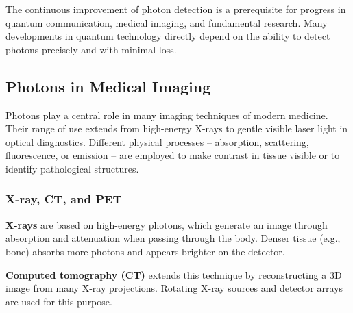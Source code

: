 \begin{tcolorbox}[hinweisbox, title=Note on the Importance of Detection Technology]
	\label{box:detektionstechnologie}
	The continuous improvement of photon detection is a prerequisite for progress in quantum communication, medical imaging, and fundamental research. Many developments in quantum technology directly depend on the ability to detect photons precisely and with minimal loss.
\end{tcolorbox}
\subsection{Photons in Medical Imaging}

Photons play a central role in many imaging techniques of modern medicine. Their range of use extends from high-energy X-rays to gentle visible laser light in optical diagnostics. Different physical processes – absorption, scattering, fluorescence, or emission – are employed to make contrast in tissue visible or to identify pathological structures.

\subsubsection{X-ray, CT, and PET}

\textbf{X-rays} are based on high-energy photons, which generate an image through absorption and attenuation when passing through the body. Denser tissue (e.g., bone) absorbs more photons and appears brighter on the detector.

\textbf{Computed tomography (CT)} extends this technique by reconstructing a 3D image from many X-ray projections. Rotating X-ray sources and detector arrays are used for this purpose.

